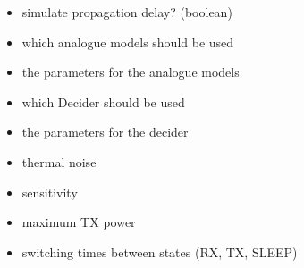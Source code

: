 \begin{itemize}
	\item simulate propagation delay? (boolean)
	\item which analogue models should be used
	\item the parameters for the analogue models
	\item which Decider should be used
	\item the parameters for the decider
	\item thermal noise
	\item sensitivity
	\item maximum TX power
	\item switching times between states (RX, TX, SLEEP)
\end{itemize}




